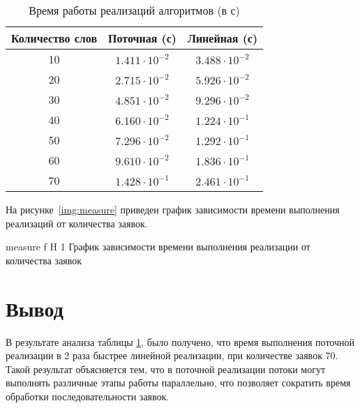 \begin{table}[H]
	\begin{center}
		\begin{threeparttable}
			\captionsetup{justification=raggedright,singlelinecheck=off}
			\caption{Время работы реализаций алгоритмов (в с)}
			\label{tbl:time_measurements}
			\begin{tabular}{|c|c|c|}
				\hline
				Количество слов & Поточная (с) & Линейная (с) \\
			\hline
			10 &$ 1.411\cdot 10^{-2} $&$ 3.488\cdot 10^{-2}$\\
			\hline
			20 &$ 2.715\cdot 10^{-2} $&$ 5.926\cdot 10^{-2}$\\
			\hline
			30 &$ 4.851\cdot 10^{-2} $&$ 9.296\cdot 10^{-2}$\\
			\hline
			40 &$ 6.160\cdot 10^{-2} $&$ 1.224\cdot 10^{-1}$\\
			\hline
			50 &$ 7.296\cdot 10^{-2} $&$ 1.292\cdot 10^{-1}$\\
			\hline
			60 &$ 9.610\cdot 10^{-2} $&$ 1.836\cdot 10^{-1}$\\
			\hline
			70 &$ 1.428\cdot 10^{-1} $&$ 2.461\cdot 10^{-1}$\\
			\hline
			\end{tabular}
		\end{threeparttable}
	\end{center}
\end{table}


На рисунке~\ref{img:measure} приведен график зависимости времени выполнения реализаций от количества заявок. 

{measure} %
{f} %
{H} %
{1\textwidth} %
{График зависимости времени выполнения реализации от количества заявок} %

\section*{Вывод}

В результате анализа таблицы \ref{tbl:time_measurements}, было получено, что время выполнения поточной реализации в 2 раза быстрее линейной реализации, при количестве заявок 70. Такой результат объясняется тем, что в поточной реализации потоки могут выполнять различные этапы работы параллельно, что позволяет сократить время обработки последовательности заявок.
